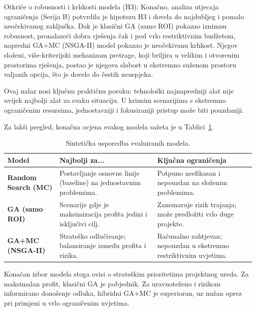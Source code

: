 Otkriće o robusnosti i krhkosti modela (H3):
Konačno, analiza utjecaja ograničenja (Serija B) potvrdila je hipotezu H3 i dovela do najdubljeg i pomalo neočekivanog zaključka. Dok je klasični GA (samo ROI) pokazao iznimnu robusnost, pronalazeći dobra rješenja čak i pod vrlo restriktivnim budžetom, napredni GA+MC (NSGA-II) model pokazao je neočekivanu krhkost. Njegov složeni, više-kriterijski mehanizam pretrage, koji briljira u velikim i otvorenim prostorima rješenja, postao je njegova slabost u ekstremno suženom prostoru valjanih opcija, što je dovelo do čestih neuspjeha.

Ovaj nalaz nosi ključnu praktičnu poruku: tehnološki najnapredniji alat nije uvijek najbolji alat za svaku situaciju. U kriznim scenarijima s ekstremno ograničenim resursima, jednostavniji i fokusiraniji pristup može biti pouzdaniji.

Za lakši pregled, konačna ocjena svakog modela sažeta je u Tablici~\ref{tab:sinteza_modela}.

\begin{table}[H]
\centering
\caption{Sintetička usporedba evaluiranih modela.}
\label{tab:sinteza_modela}
\begin{tabular}{|l|p{4cm}|p{4cm}|}
\hline
\textbf{Model} & \textbf{Najbolji za...} & \textbf{Ključna ograničenja} \\
\hline
\textbf{Random Search (MC)} & Postavljanje osnovne linije (baseline) na jednostavnim problemima. & Potpuno neefikasan i nepouzdan na složenim problemima. \\
\hline
\textbf{GA (samo ROI)} & Scenarije gdje je maksimizacija profita jedini i isključivi cilj. & Zanemaruje rizik trajanja; može predložiti vrlo duge projekte. \\
\hline
\textbf{GA+MC (NSGA-II)} & Strateško odlučivanje; balansiranje između profita i rizika. & Računalno zahtjevan; nepouzdan u ekstremno restriktivnim uvjetima. \\
\hline
\end{tabular}
\end{table}


Konačan izbor modela stoga ovisi o strateškim prioritetima projektnog ureda. Za maksimalan profit, klasični GA je pobjednik. Za uravnoteženo i rizikom informirano donošenje odluka, hibridni GA+MC je superioran, uz nužan oprez pri primjeni u vrlo ograničenim uvjetima.
